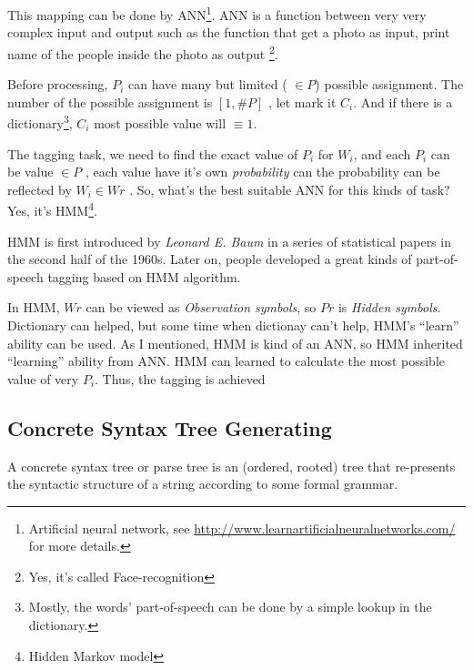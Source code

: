 This mapping can be done by ANN\footnote{Artificial neural network, see \url{http://www.learnartificialneuralnetworks.com/} for more details. }.
ANN is a function between very very complex input and output such as the function that get a photo as input, print name of the people inside the photo as output \footnote{Yes, it's called Face-recognition}.

Before processing, $P_i$ can have many but limited ( $\in P$) possible  assignment. The number of the possible assignment is $[1, \#P ] $ , let mark it $ C_i $. 
And if there is a dictionary\footnote{Mostly, the words' part-of-speech can be done by a simple lookup in the dictionary.}, $ C_i $ most possible value will $ \equiv 1 $. 

The tagging task, we need to find the exact value of $P_i$ for $W_i$, and each $P_i$ can be value $ \in P $ ,  each value have it's own \emph{probability} can the probability can be reflected by $ W_i \in Wr $ . So, what's the best suitable ANN for this kinds of task? Yes, it's HMM\footnote{Hidden Markov model}{\citep{HMM_Based_Part_Of_Speech_Tagging}}.

HMM is first introduced by \emph{Leonard E. Baum} in a series of statistical papers in the second half of the 1960s. Later on, people developed a great kinds of part-of-speech tagging based on HMM algorithm. 

In HMM, $ Wr $ can be viewed as \emph{Observation symbols}, so $Pr$ is \emph{Hidden symbols}. Dictionary can helped, but some time when dictionay can't help, HMM's ``learn'' ability  can be used. As I mentioned, HMM is kind of an ANN, so HMM inherited ``learning'' ability from ANN.
HMM can learned to calculate the most possible value of very $P_i$. Thus, the tagging is achieved

\subsection{Concrete Syntax Tree Generating}

A concrete syntax tree\cite{cst} or parse tree is an (ordered, rooted) tree that re-presents the syntactic structure of a string according to some formal grammar.

